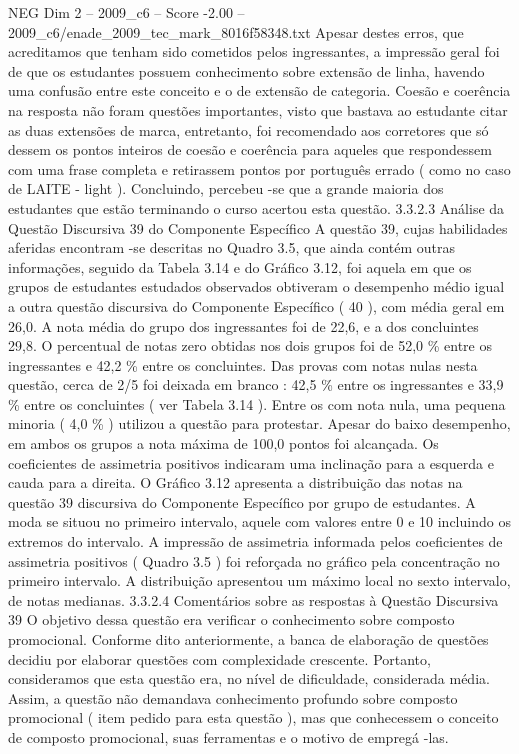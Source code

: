 \begin{textsample}{NEG Dim 2 – 2009\_c6 – Score -2.00 – 2009\_c6/enade\_2009\_tec\_mark\_8016f58348.txt}
Apesar destes erros, que acreditamos que tenham sido cometidos pelos ingressantes, a impressão geral foi de que os estudantes possuem conhecimento sobre extensão de linha, havendo uma confusão entre este conceito e o de extensão de categoria.
Coesão e coerência na resposta não foram questões importantes, visto que bastava ao estudante citar as duas extensões de marca, entretanto, foi recomendado aos corretores que só dessem os pontos inteiros de coesão e coerência para aqueles que respondessem com uma frase completa e retirassem pontos por português errado ( como no caso de LAITE - light ).
Concluindo, percebeu -se que a grande maioria dos estudantes que estão terminando o curso acertou esta questão. 3.3.2.3 Análise da Questão Discursiva 39 do Componente Específico A questão 39, cujas habilidades aferidas encontram -se descritas no Quadro 3.5, que ainda contém outras informações, seguido da Tabela 3.14 e do Gráfico 3.12, foi aquela em que os grupos de estudantes estudados observados obtiveram o desempenho médio igual a outra questão discursiva do Componente Específico ( 40 ), com média geral em 26,0.
A nota média do grupo dos ingressantes foi de 22,6, e a dos concluintes 29,8.
O percentual de notas zero obtidas nos dois grupos foi de 52,0 \% entre os ingressantes e 42,2 \% entre os concluintes.
Das provas com notas nulas nesta questão, cerca de 2/5 foi deixada em branco : 42,5 \% entre os ingressantes e 33,9 \% entre os concluintes ( ver Tabela 3.14 ).
Entre os com nota nula, uma pequena minoria ( 4,0 \% ) utilizou a questão para protestar.
Apesar do baixo desempenho, em ambos os grupos a nota máxima de 100,0 pontos foi alcançada.
Os coeficientes de assimetria positivos indicaram uma inclinação para a esquerda e cauda para a direita.
O Gráfico 3.12 apresenta a distribuição das notas na questão 39 discursiva do Componente Específico por grupo de estudantes.
A moda se situou no primeiro intervalo, aquele com valores entre 0 e 10 incluindo os extremos do intervalo.
A impressão de assimetria informada pelos coeficientes de assimetria positivos ( Quadro 3.5 ) foi reforçada no gráfico pela concentração no primeiro intervalo.
A distribuição apresentou um máximo local no sexto intervalo, de notas medianas. 3.3.2.4 Comentários sobre as respostas à Questão Discursiva 39 O objetivo dessa questão era verificar o conhecimento sobre composto promocional.
Conforme dito anteriormente, a banca de elaboração de questões decidiu por elaborar questões com complexidade crescente.
Portanto, consideramos que esta questão era, no nível de dificuldade, considerada média.
Assim, a questão não demandava conhecimento profundo sobre composto promocional ( item pedido para esta questão ), mas que conhecessem o conceito de composto promocional, suas ferramentas e o motivo de empregá -las.

\end{textsample}
